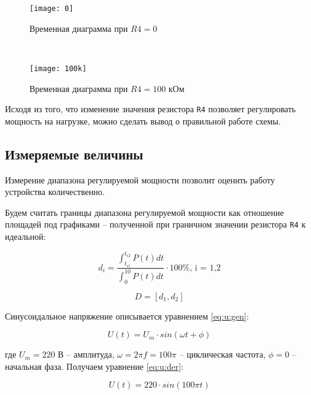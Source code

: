 \begin{figure}[H]
\begin{center}
	\texttt{[image: 0]}
	\caption{Временная диаграмма при $R4 = 0$}
	\label{pic:diag:0}
\end{center}
\end{figure}

~

\begin{figure}[H]
\begin{center}
	\texttt{[image: 100k]}
	\caption{Временная диаграмма при $R4 = 100$ кОм}
	\label{pic:diag:100k}
\end{center}
\end{figure}

Исходя из того, что изменение значения резистора \verb+R4+ позволяет регулировать мощность на нагрузке, можно сделать вывод о правильной работе схемы.

\subsection{Измеряемые величины}

Измерение диапазона регулируемой мощности позволит оценить работу устройства количественно.

Будем считать границы диапазона регулируемой мощности как отношение площадей под графиками -- полученной при граничном значении резистора \verb+R4+ к идеальной:

\begin{equation}
\label{eq:d:i}
	d_i = \frac{\int_{t_{i1}}^{t_{i2}} P(t) dt}{\int_{0}^{10} P(t) dt} \cdot 100\% \text{, i = 1,2}
\end{equation}

\begin{equation}
	D = [d_1, d_2]
\end{equation}

Синусоидальное напряжение описывается уравнением \ref{eq:u:gen}: 

\begin{equation}
\label{eq:u:gen}
	U(t) = U_m \cdot sin(\omega t + \phi)
\end{equation}

\noindent где $U_m = 220$ В -- амплитуда, $\omega = 2 \pi f = 100 \pi$ -- циклическая частота, $\phi = 0$ -- начальная фаза. Получаем уравнение \ref{eq:u:der}:

\begin{equation}
\label{eq:u:der}
	U(t) = 220 \cdot sin \left(100 \pi t \right)
\end{equation}

